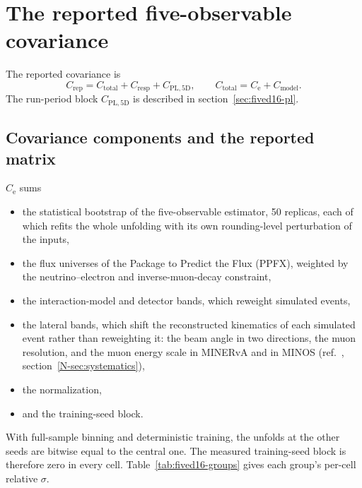 \section{The reported five-observable covariance}
\label{supp:cov16}

\label{sec:fived16-cov}
The reported covariance is
\begin{equation*}
  C_{\mathrm{rep}}=C_{\mathrm{total}}+C_{\mathrm{resp}}+C_{\mathrm{PL,5D}},\qquad C_{\mathrm{total}}=C_{\mathrm{e}}+C_{\mathrm{model}}.
\end{equation*}
The run-period block $C_{\mathrm{PL,5D}}$ is described in section~\ref{sec:fived16-pl}.

\subsection{Covariance components and the reported matrix}
\label{supp:cov16-blocks}
$C_{\mathrm{e}}$ sums
\begin{itemize}[itemsep=0pt, topsep=1pt]
  \item the statistical bootstrap of the five-observable estimator, 50 replicas, each of which refits the whole unfolding with its own rounding-level perturbation of the inputs,
  \item the flux universes of the Package to Predict the Flux (PPFX), weighted by the neutrino--electron and inverse-muon-decay constraint,
  \item the interaction-model and detector bands, which reweight simulated events,
  \item the  lateral bands, which shift the reconstructed kinematics of each simulated event rather than reweighting it: the beam angle in two directions, the muon resolution, and the muon energy scale in MINERvA and in MINOS (ref.~\cite{AnalysisNote2026}, section~\ref*{N-sec:systematics}),
  \item the normalization,
  \item and the training-seed block.
\end{itemize}
With full-sample binning and deterministic training, the unfolds at the other seeds are bitwise equal to the central one. The measured training-seed block is therefore zero in every cell. Table~\ref{tab:fived16-groups} gives each group's per-cell relative $\sigma$.

